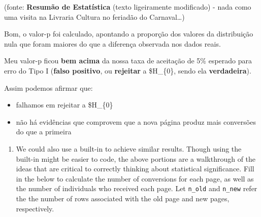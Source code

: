 \documentclass[11pt]{article}
\providecommand{\tightlist}{%
      \setlength{\itemsep}{0pt}\setlength{\parskip}{0pt}}
\begin{document}
(fonte: \textbf{Resumão de Estatística} (texto ligeiramente modificado)
- nada como uma visita na Livraria Cultura no feriadão do
Carnaval\ldots{})

Bom, o valor-p foi calculado, apontando a proporção dos valores da
distribuição nula que foram maiores do que a diferença observada nos
dados reais.

Meu valor-p ficou \textbf{bem acima} da nossa taxa de aceitação de 5\%
esperado para erro do Tipo I (\textbf{falso positivo}, ou
\textbf{rejeitar} a \$H\_\{0\}, sendo ela \textbf{verdadeira}).

Assim podemos afirmar que:

\begin{itemize}
\item
  falhamos em rejeitar a \$H\_\{0\}
\item
  não há evidências que comprovem que a nova página produz mais
  conversões do que a primeira
\end{itemize}

    \begin{enumerate}
\def\labelenumi{\alph{enumi}.}
\setcounter{enumi}{11}
\tightlist
\item
  We could also use a built-in to achieve similar results. Though using
  the built-in might be easier to code, the above portions are a
  walkthrough of the ideas that are critical to correctly thinking about
  statistical significance. Fill in the below to calculate the number of
  conversions for each page, as well as the number of individuals who
  received each page. Let \texttt{n\_old} and \texttt{n\_new} refer the
  the number of rows associated with the old page and new pages,
  respectively.
\end{enumerate}
\end{document}
